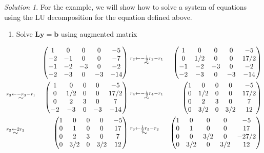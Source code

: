 \documentclass[
]{book}
\providecommand{\tightlist}{%
  \setlength{\itemsep}{0pt}\setlength{\parskip}{0pt}}
\theoremstyle{definition}
\theoremstyle{definition}
\theoremstyle{definition}
\theoremstyle{definition}
\theoremstyle{remark}
\newtheorem*{solution}{Solution}
\begin{document}
\begin{solution}
For the example, we will show how to solve a system of equations using the LU decomposition for the equation defined above.

\begin{enumerate}
\def\labelenumi{\arabic{enumi})}
\tightlist
\item
  Solve \(\mathbf{L} \mathbf{y} = \mathbf{b}\) using augmented matrix
\end{enumerate}

\[
\begin{aligned}
& & \begin{pmatrix} 1 & 0 & 0 & 0 & -5 \\ -2 & -1 & 0 & 0 & -7 \\ -1 & -2 & -3 & 0 & -2 \\ -2 & -3 & 0 & -3 & -14 \end{pmatrix} & \stackrel{r_2 \leftarrow -\frac{1}{2} r_2 - r_1}{\huge \sim} & \begin{pmatrix} 1 & 0 & 0 & 0 & -5 \\ 0 & 1/2 & 0 & 0 & 17/2 \\ -1 & -2 & -3 & 0 & -2 \\ -2 & -3 & 0 & -3 & -14 \end{pmatrix} \\
& \stackrel{r_3 \leftarrow - r_3 - r_1}{\huge \sim} & \begin{pmatrix} 1 & 0 & 0 & 0 & -5 \\ 0 & 1/2 & 0 & 0 & 17/2 \\ 0 & 2 & 3 & 0 & 7 \\ -2 & -3 & 0 & -3 & -14 \end{pmatrix} & \stackrel{r_4 \leftarrow - \frac{1}{2} r_4 - r_1}{\huge \sim} & \begin{pmatrix} 1 & 0 & 0 & 0 & -5 \\ 0 & 1/2 & 0 & 0 & 17/2 \\ 0 & 2 & 3 & 0 & 7 \\ 0 & 3/2 & 0 & 3/2 & 12 \end{pmatrix} \\
& \stackrel{r_2 \leftarrow 2 r_2}{\huge \sim} & \begin{pmatrix} 1 & 0 & 0 & 0 & -5 \\ 0 & 1 & 0 & 0 & 17 \\ 0 & 2 & 3 & 0 & 7 \\ 0 & 3/2 & 0 & 3/2 & 12 \end{pmatrix} & \stackrel{r_3 \leftarrow \frac{1}{2} r_3 - r_2}{\huge \sim} & \begin{pmatrix} 1 & 0 & 0 & 0 & -5 \\ 0 & 1 & 0 & 0 & 17 \\ 0 & 0 & 3/2 & 0 & -27/2 \\ 0 & 3/2 & 0 & 3/2 & 12 \end{pmatrix} \\

\end{aligned}\]
\end{solution}
\end{document}
